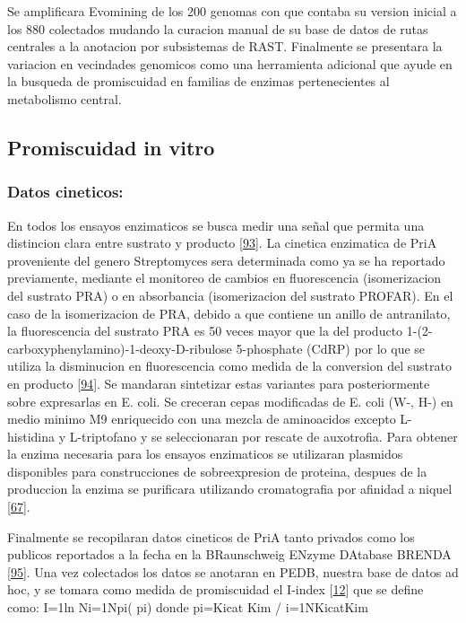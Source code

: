 \documentclass[12pt,twoside]{reedthesis}
\begin{document}
  Se amplificara Evomining de los 200 genomas con que contaba su version
  inicial a los 880 colectados mudando la curacion manual de su base de
  datos de rutas centrales a la anotacion por subsistemas de RAST.
  Finalmente se presentara la variacion en vecindades genomicos como una
  herramienta adicional que ayude en la busqueda de promiscuidad en
  familias de enzimas pertenecientes al metabolismo central.
  
  \subsection{Promiscuidad in vitro}\label{promiscuidad-in-vitro}
  
  \subsubsection{Datos cineticos:}\label{datos-cineticos}
  
  En todos los ensayos enzimaticos se busca medir una señal que permita
  una distincion clara entre sustrato y producto
  {[}\protect\hyperlink{ref-bisswanger_general_2011}{93}{]}. La cinetica
  enzimatica de PriA proveniente del genero Streptomyces sera determinada
  como ya se ha reportado previamente, mediante el monitoreo de cambios en
  fluorescencia (isomerizacion del sustrato PRA) o en absorbancia
  (isomerizacion del sustrato PROFAR). En el caso de la isomerizacion de
  PRA, debido a que contiene un anillo de antranilato, la fluorescencia
  del sustrato PRA es 50 veces mayor que la del producto
  1-(2-carboxyphenylamino)-1-deoxy-D-ribulose 5-phosphate (CdRP) por lo
  que se utiliza la disminucion en fluorescencia como medida de la
  conversion del sustrato en producto
  {[}\protect\hyperlink{ref-hommel_phosphoribosyl_1995}{94}{]}. Se
  mandaran sintetizar estas variantes para posteriormente sobre
  expresarlas en E. coli. Se creceran cepas modificadas de E. coli (W-,
  H-) en medio minimo M9 enriquecido con una mezcla de aminoacidos excepto
  L-histidina y L-triptofano y se seleccionaran por rescate de auxotrofia.
  Para obtener la enzima necesaria para los ensayos enzimaticos se
  utilizaran plasmidos disponibles para construcciones de sobreexpresion
  de proteina, despues de la produccion la enzima se purificara utilizando
  cromatografia por afinidad a niquel
  {[}\protect\hyperlink{ref-verduzco-castro_co-occurrence_2016}{67}{]}.
  
  Finalmente se recopilaran datos cineticos de PriA tanto privados como
  los publicos reportados a la fecha en la BRaunschweig ENzyme DAtabase
  BRENDA {[}\protect\hyperlink{ref-scheer_brenda_2011}{95}{]}. Una vez
  colectados los datos se anotaran en PEDB, nuestra base de datos ad hoc,
  y se tomara como medida de promiscuidad el I-index
  {[}\protect\hyperlink{ref-nath_quantitative_2008}{12}{]} que se define
  como: I=1ln Ni=1Npi( pi) donde pi=Kicat Kim / i=1NKicatKim
  
\end{document}
